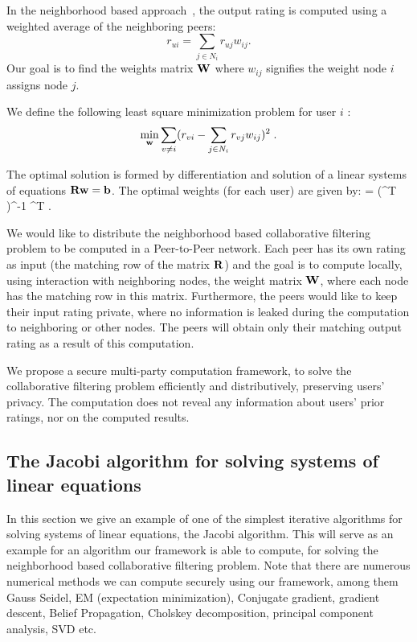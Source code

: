 \documentclass[10pt]{svjour3}
\begin{document}
In the neighborhood based approach~\cite{KorenCF}, the output
rating is computed using a weighted average of the neighboring
peers:
\[ r_{ui} = \sum_{j \in N_i} r_{uj} w_{ij}. \]
Our goal is to find the weights matrix ${\bf W}$ where $w_{ij}$
signifies the weight node $i$ assigns node $j$.

We define the following least square minimization problem for user
$i$ :
\[ \min_{\bf w} \sum_{v \ne i}(r_{vi} - \sum_{j \in N_i}
r_{vj} w_{ij})^2\;. \]

The optimal solution is formed by differentiation and solution of
a linear systems of equations ${\bf R} {\bf w} = {\bf b}$. The optimal weights
(for each user) are given by: \BE \label{eqw} \vw = (\mR^T
\mR)^{-1} \mR^T \vb\;. \EE

We would like to distribute the neighborhood based collaborative
filtering problem to be computed in a Peer-to-Peer network. Each
peer has its own rating as input (the matching row of the matrix
${\bf R}$) and the goal is to compute locally, using interaction with
neighboring nodes, the weight matrix ${\bf W}$, where each node has
the matching row in this matrix. Furthermore, the peers would like
to keep their input rating private, where no information is leaked
during the computation to neighboring or other nodes. The peers
will obtain only their matching output rating as a result of this
computation.

We propose a secure multi-party computation framework, to solve the
collaborative filtering problem efficiently and distributively,
preserving users' privacy. The computation does not reveal any
information about users' prior ratings, nor on the computed
results.

\subsection{The Jacobi algorithm for solving systems of
linear equations}\label{Jacobi} In this section we give an example
of one of the simplest iterative algorithms for solving systems of
linear equations, the Jacobi algorithm. This will serve as an
example for an algorithm our framework is able to compute, for
solving the neighborhood based collaborative filtering problem.
Note that there are numerous numerical methods we can compute
securely using our framework, among them Gauss Seidel, EM
(expectation minimization), Conjugate gradient, gradient descent,
Belief Propagation, Cholskey decomposition, principal component
analysis, SVD etc.
\end{document}

